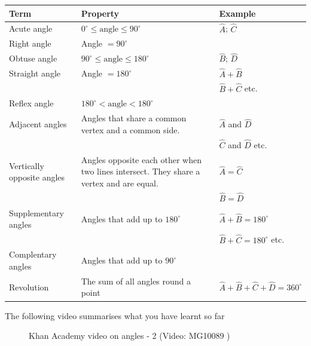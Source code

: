 \begin{table}[H]
\begin{center}
\begin{tabular}{|l|p{4cm}|l|} \hline
Term & Property & Example\\ \hline
Acute angle & $0^{\circ} \leq \mbox{angle} \leq 90^{\circ}$ & $\hat{A}$; $\hat{C}$ \\ \hline
Right angle & Angle $= 90^{\circ}$ &  \\ \hline
Obtuse angle & $90^{\circ} \leq \mbox{angle} \leq 180^{\circ}$ & $\hat{B}$; $\hat{D}$ \\ \hline
Straight angle & Angle $= 180^{\circ}$ & $\hat{A} + \hat{B}$\\
& & $\hat{B} + \hat{C}$ etc.  \\ \hline
Reflex angle & $180^{\circ} < \mbox{angle} < 180^{\circ}$ &  \\ \hline
Adjacent angles & Angles that share a common vertex and a common side. & $\hat{A}$ and $\hat{D}$ \\ 
& & $\hat{C}$ and $\hat{D}$ etc. \\ \hline
Vertically opposite angles & Angles opposite each other when two lines intersect. They share a vertex and are equal. & $\hat{A}=\hat{C}$\\
 &  & $\hat{B}=\hat{D}$\\ \hline
Supplementary angles & Angles that add up to $180^{\circ}$ & $\hat{A}+\hat{B}=180^{\circ}$\\ \hline
& & $\hat{B}+\hat{C}=180^{\circ}$ etc. \\ \hline
Complentary angles & Angles that add up to $90^{\circ}$ & \\ \hline
Revolution & The sum of all angles round a point &  $\hat{A}+\hat{B}+\hat{C}+\hat{D}=360^{\circ}$ \\ \hline

\end{tabular}
\end{center}
\end{table}
\par

The following video summarises what you have learnt so far
\setcounter{subfigure}{0}
\begin{figure}[H] %
\textnormal{Khan Academy video on angles - 2}\vspace{.1in} \nopagebreak
\label{m39370*yt-media2}\label{m39370*yt-video2}
{ (Video:  MG10089 )}
\vspace{2pt}
\vspace{.1in}
\end{figure}       \par 

